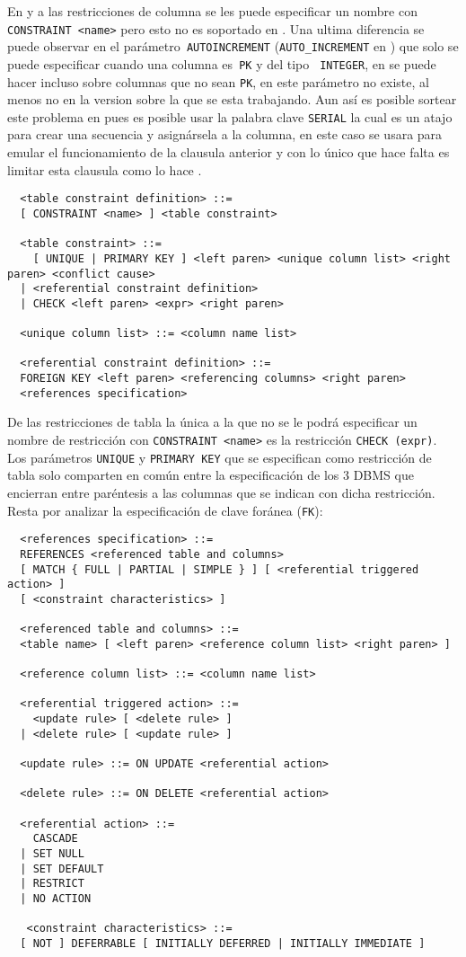 En \s y \p a las restricciones de columna se les puede especificar un nombre con \verb=CONSTRAINT <name>= pero esto no es soportado en \m. Una ultima diferencia se puede observar en el parámetro\verb= AUTOINCREMENT= (\verb=AUTO_INCREMENT= en \m) que solo se puede especificar cuando una columna es\verb= PK= y del tipo \verb= INTEGER=, en \m se puede hacer incluso sobre columnas que no sean \verb=PK=, en \p este parámetro no existe, al menos no en la version  sobre la que se esta trabajando. Aun así es posible sortear este problema en \p pues es posible usar la palabra clave \verb=SERIAL= la cual es un atajo para crear una secuencia y asignársela a la columna, en este caso se usara para emular el funcionamiento de la clausula anterior y con \m lo único que hace falta es limitar esta clausula como lo hace \s.   
%
\begin{Verbatim}
  <table constraint definition> ::=
  [ CONSTRAINT <name> ] <table constraint>

  <table constraint> ::=
    [ UNIQUE | PRIMARY KEY ] <left paren> <unique column list> <right paren> <conflict cause>
  | <referential constraint definition>
  | CHECK <left paren> <expr> <right paren>

  <unique column list> ::= <column name list>

  <referential constraint definition> ::=
  FOREIGN KEY <left paren> <referencing columns> <right paren>
  <references specification>
\end{Verbatim}
%
De las restricciones de tabla la única a la que no se le podrá especificar un nombre de restricción con \verb=CONSTRAINT <name>= es la restricción \verb=CHECK (expr)=. Los parámetros \verb=UNIQUE= y \verb=PRIMARY KEY= que se especifican como restricción de tabla solo comparten en común entre la especificación de los 3 DBMS que encierran entre paréntesis a las columnas que se indican con dicha restricción. Resta por analizar la especificación de clave foránea (\verb=FK=):    
%
\begin{Verbatim}
  <references specification> ::=
  REFERENCES <referenced table and columns>
  [ MATCH { FULL | PARTIAL | SIMPLE } ] [ <referential triggered action> ]
  [ <constraint characteristics> ]

  <referenced table and columns> ::=
  <table name> [ <left paren> <reference column list> <right paren> ]

  <reference column list> ::= <column name list>

  <referential triggered action> ::=
    <update rule> [ <delete rule> ]
  | <delete rule> [ <update rule> ]

  <update rule> ::= ON UPDATE <referential action>

  <delete rule> ::= ON DELETE <referential action>

  <referential action> ::=
    CASCADE
  | SET NULL
  | SET DEFAULT
  | RESTRICT
  | NO ACTION

   <constraint characteristics> ::=
  [ NOT ] DEFERRABLE [ INITIALLY DEFERRED | INITIALLY IMMEDIATE ]
\end{Verbatim}
